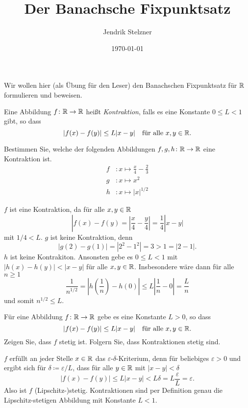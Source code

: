 \documentclass[a4paper,10pt]{article}
\title{Der Banachsche Fixpunktsatz}
\author{Jendrik Stelzner}
\date{\today}
\begin{document}
\maketitle


Wir wollen hier (als Übung für den Leser) den Banachschen Fixpunktsatz für $\mathbb{R}$ formulieren und beweisen.


\begin{defi}
 Eine Abbildung $f \colon \mathbb{R} \to \mathbb{R}$ heißt \emph{Kontraktion}, falls es eine Konstante $0 \leq L < 1$ gibt, so dass
 \[
  |f(x)-f(y)| \leq L|x-y| \quad \text{für alle $x,y \in \mathbb{R}$}.
 \]
\end{defi}


\begin{question}
 Bestimmen Sie, welche der folgenden Abbildungen $f, g, h \colon \mathbb{R} \to \mathbb{R}$ eine Kontraktion ist.
 \begin{align*}
  f&: x \mapsto \frac{x}{4} - \frac{2}{3} \\
  g&: x \mapsto x^2 \\
  h&: x \mapsto |x|^{1/2}
 \end{align*}
\end{question}
\begin{solution}
 $f$ ist eine Kontraktion, da für alle $x,y \in \mathbb{R}$
 \[
  |f(x)-f(y) = \left| \frac{x}{4} - \frac{y}{4} \right| = \frac{1}{4}|x-y|
 \]
 mit $1/4 < L$.
 $g$ ist keine Kontraktion, denn
 \[
  |g(2)-g(1)| = |2^2 - 1^2| = 3 > 1 = |2-1|.
 \]
 $h$ ist keine Kontrakiton. Ansonsten gebe es $0 \leq L < 1$ mit $|h(x)-h(y)| < |x-y|$ für alle $x, y \in \mathbb{R}$. Insbesondere wäre dann für alle $n \geq 1$
 \[
  \frac{1}{n^{1/2}}
  = \left|h\left(\frac{1}{n}\right) - h(0)\right|
  \leq L\left| \frac{1}{n} - 0\right|
  = \frac{L}{n}
 \]
 und somit $n^{1/2} \leq L$.
\end{solution}


\begin{question}
 Für eine Abbildung $f \colon \mathbb{R} \to \mathbb{R}$ gebe es eine Konstante $L > 0$, so dass
 \[
  |f(x)-f(y)| \leq L|x-y| \quad \text{für alle $x,y \in \mathbb{R}$}.
 \]
 Zeigen Sie, dass $f$ stetig ist. Folgern Sie, dass Kontraktionen stetig sind.
\end{question}
\begin{solution}
 $f$ erfüllt an jeder Stelle $x \in \mathbb{R}$ das $\varepsilon$-$\delta$-Kriterium, denn für beliebiges $\varepsilon > 0$ und ergibt sich für $\delta \coloneqq \varepsilon/L$, dass für alle $y \in \mathbb{R}$ mit $|x-y| < \delta$
 \[
  |f(x)-f(y)| \leq L|x-y| < L\delta = L \frac{\varepsilon}{L} = \varepsilon.
 \]
 Also ist $f$ (Lipschitz-)stetig. Kontraktionen sind per Definition genau die Lipschitz-stetigen Abbildung mit Konstante $L < 1$.
\end{solution}
\end{document}

